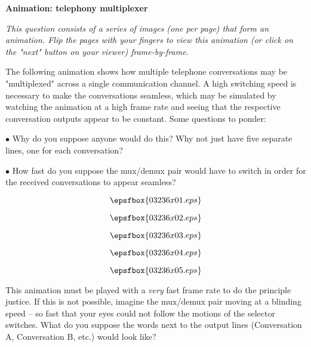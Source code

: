 

\centerline{\bf Animation: telephony multiplexer}

\vskip 10pt

{\it This question consists of a series of images (one per page) that form an animation.  Flip the pages with your fingers to view this animation (or click on the "next" button on your viewer) frame-by-frame.}

\vskip 10pt

The following animation shows how multiple telephone conversations may be "multiplexed" across a single communication channel.  A high switching speed is necessary to make the conversations seamless, which may be simulated by watching the animation at a high frame rate and seeing that the respective conversation outputs appear to be constant.  Some questions to ponder:

\medskip
\goodbreak
\item{$\bullet$} Why do you suppose anyone would do this?  Why not just have five separate lines, one for each conversation?
\item{$\bullet$} How fast do you suppose the mux/demux pair would have to switch in order for the received conversations to appear seamless?
\medskip

\vfil \eject
$$\epsfbox{03236x01.eps}$$

\vfil \eject
$$\epsfbox{03236x02.eps}$$

\vfil \eject
$$\epsfbox{03236x03.eps}$$

\vfil \eject
$$\epsfbox{03236x04.eps}$$

\vfil \eject
$$\epsfbox{03236x05.eps}$$


\vfil \eject







This animation must be played with a {\it very} fast frame rate to do the principle justice.  If this is not possible, imagine the mux/demux pair moving at a blinding speed -- so fast that your eyes could not follow the motions of the selector switches.  What do you suppose the words next to the output lines (Conversation A, Conversation B, etc.) would look like?

